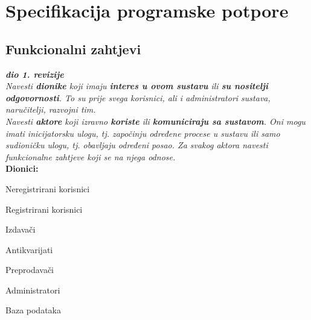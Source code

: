 \chapter{Specifikacija programske potpore}
		
	\section{Funkcionalni zahtjevi}
			
			\textbf{\textit{dio 1. revizije}}\\
			
			\textit{Navesti \textbf{dionike} koji imaju \textbf{interes u ovom sustavu} ili  \textbf{su nositelji odgovornosti}. To su prije svega korisnici, ali i administratori sustava, naručitelji, razvojni tim.}\\
				
			\textit{Navesti \textbf{aktore} koji izravno \textbf{koriste} ili \textbf{komuniciraju sa sustavom}. Oni mogu imati inicijatorsku ulogu, tj. započinju određene procese u sustavu ili samo sudioničku ulogu, tj. obavljaju određeni posao. Za svakog aktora navesti funkcionalne zahtjeve koji se na njega odnose.}\\
			
			
			\noindent \textbf{Dionici:}
			\begin{packed_enum}
				\item Neregistrirani korisnici
				\item Registrirani korisnici
					\begin{packed_enum}
						\item Izdavači
						\item Antikvarijati
						\item Preprodavači
					\end{packed_enum}
				\item Administratori
				\item Baza podataka
			\end{packed_enum}
			
